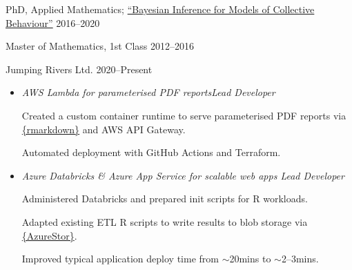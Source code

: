 \documentclass[12pt, a4paper]{article}
\begin{document}

\makecard




%
        {PhD, Applied Mathematics;
            \href{https://jwalton.info/assets/thesis.pdf}%
                 {``Bayesian Inference for Models of Collective Behaviour''}}%
        {2016--2020}

%
        {Master of Mathematics, 1st Class}%
        {2012--2016}



%
        {Jumping Rivers Ltd.}%
        {2020--Present}

\vspace{-1em}


\begin{itemize}[
    itemsep=.05em,
    labelwidth=2em,
    leftmargin=1.5em,
    topsep=0em]

    \item[]  
                   {\emph{AWS Lambda for parameterised PDF reports\hfill{}Lead Developer}

                    Created a custom container runtime to serve parameterised PDF reports via
                    \href{https://rmarkdown.rstudio.com/}{\{rmarkdown\}} and AWS API Gateway.

                    Automated deployment with GitHub Actions and Terraform.}%

    \item[]  
                   {\emph{Azure Databricks \& Azure App Service for scalable web apps
                    \hfill{}Lead Developer}

                    Administered Databricks and prepared init scripts for R workloads.

                    Adapted existing ETL R scripts to write results to blob storage via
                    \href{https://cran.r-project.org/web/packages/AzureStor/vignettes/intro.html}%
                         {\{AzureStor\}}.

                    Improved typical application deploy time from $\sim$20mins to $\sim$2--3mins.}%

\end{itemize}
\end{document}
